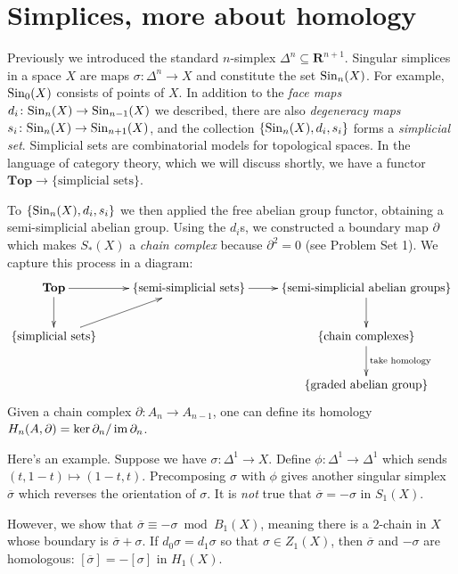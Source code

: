 
\section{Simplices, more about homology}
Previously we introduced the standard $n$-simplex $\Delta^n\subseteq\mathbf{R}^{n+1}$. Singular simplices in a space $X$ are maps $\sigma\colon\Delta^n\to X$ and constitute the set $\mathrm{Sin}_n(X)$. For example, $\mathrm{Sin}_0(X)$ consists of points of $X$. In addition to the \emph{face maps} $d_i\colon\mathrm{Sin}_n(X)\to\mathrm{Sin}_{n-1}(X)$ we described, there are also \emph{degeneracy maps} $s_i\colon\mathrm{Sin}_n(X)\to\mathrm{Sin}_{n+1}(X)$, and the collection $\{\mathrm{Sin}_n(X),d_i,s_i\}$ forms a \emph{simplicial set}. Simplicial sets are combinatorial models for topological spaces. In the language of category theory, which we will discuss shortly, we have a functor $\mathbf{Top}\to\{\text{simplicial sets}\}$.

To $\{\mathrm{Sin}_n(X),d_i,s_i\}$ we then applied the free abelian group functor, obtaining a semi-simplicial abelian group. Using the $d_i$s, we constructed a boundary map $\partial$which makes $S_\ast(X)$ a \emph{chain complex} because $\partial^2=0$ (see Problem Set 1). We capture this process in a diagram:
\begin{equation*}
\xymatrix{\mathbf{Top}\ar[d]\ar[r] & \{\text{semi-simplicial sets}\}\ar[r] & \{\text{semi-simplicial abelian groups}\}\ar[d]\\
    \{\text{simplicial sets}\}\ar[ur] & & \{\text{chain complexes}\}\ar[d]^{\text{take homology}}\\
 & &\{\text{graded abelian group}\}}
\end{equation*}
Given a chain complex $\partial\colon A_n\to A_{n-1}$, one can define its homology $H_n(A,\partial)=\ker\partial_n/\operatorname{im}\partial_n$.

Here's an example. Suppose we have $\sigma\colon \Delta^1\to X$. Define $\phi\colon\Delta^1\to\Delta^1$ which sends $(t,1-t)\mapsto (1-t,t)$. Precomposing $\sigma$ with $\phi$ gives another singular simplex $\overline{\sigma}$ which reverses the orientation of $\sigma$. It is \textit{not} true that $\overline{\sigma}=-\sigma$ in $S_1(X)$.

However, we show that $\overline{\sigma}\equiv -\sigma\bmod B_1(X)$, meaning there is a $2$-chain in $X$ whose boundary is $\overline{\sigma}+\sigma$. If $d_0\sigma=d_1\sigma$ so that $\sigma\in Z_1(X)$, then $\overline{\sigma}$ and $-\sigma$ are homologous: $[\overline{\sigma}]=-[\sigma]$ in $ H_1(X)$.

